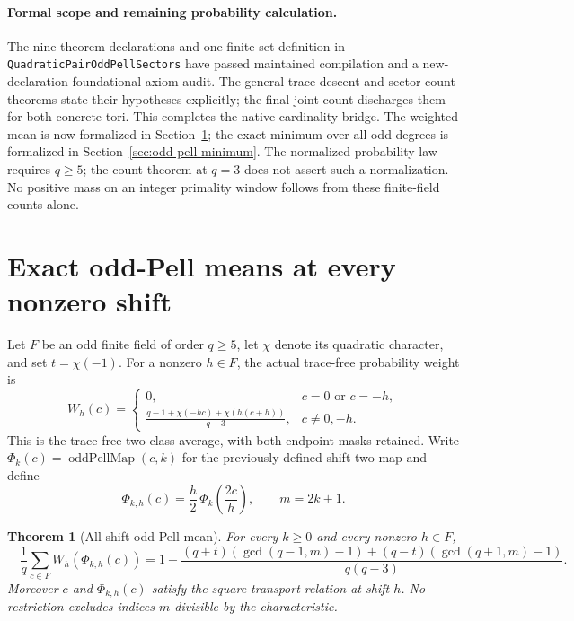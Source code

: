 \documentclass[11pt]{article}
\newtheorem{theorem}{Theorem}[section]
\begin{document}
\paragraph{Formal scope and remaining probability calculation.}
The nine theorem declarations and one finite-set definition in
\texttt{QuadraticPairOddPellSectors} have passed maintained compilation
and a new-declaration foundational-axiom audit.
The general trace-descent and sector-count theorems state their
hypotheses explicitly; the final joint count discharges them for
both concrete tori.
This completes the native cardinality bridge.
The weighted mean is now formalized in
Section~\ref{sec:odd-pell-all-shift-mean}; the exact minimum over all
odd degrees is formalized in Section~\ref{sec:odd-pell-minimum}.
The normalized probability law requires \(q\ge5\);
the count theorem at \(q=3\) does not assert such a normalization.
No positive mass on an integer primality window follows from these
finite-field counts alone.


\section{Exact odd-Pell means at every nonzero shift}
\label{sec:odd-pell-all-shift-mean}

Let \(F\) be an odd finite field of order \(q\ge5\), let
\(\chi\) denote its quadratic character, and set \(t=\chi(-1)\).
For a nonzero \(h\in F\), the actual trace-free probability weight is
\[
 W_h(c)=
 \begin{cases}
 0,&c=0\text{ or }c=-h,\\[2pt]
 \displaystyle\frac{q-1+\chi(-hc)+\chi(h(c+h))}{q-3},
       &c\ne0,-h .
 \end{cases}
\]
This is the trace-free two-class average, with both endpoint masks
retained. Write \(\Phi_k(c)=\operatorname{oddPellMap}(c,k)\) for the
previously defined shift-two map and define
\[
 \Phi_{k,h}(c)=\frac h2\,\Phi_k\!\left(\frac{2c}{h}\right),
 \qquad m=2k+1.
\]

\begin{theorem}[All-shift odd-Pell mean]\label{thm:odd-pell-all-shift-mean}
For every \(k\ge0\) and every nonzero \(h\in F\),
\[
 \boxed{\quad
 \frac1q\sum_{c\in F}W_h(\Phi_{k,h}(c))
 =1-
 \frac{(q+t)(\gcd(q-1,m)-1)+(q-t)(\gcd(q+1,m)-1)}
      {q(q-3)}.\quad}
\]
Moreover \(c\) and \(\Phi_{k,h}(c)\) satisfy the square-transport
relation at shift \(h\). No restriction excludes indices \(m\)
divisible by the characteristic.
\end{theorem}
\end{document}
